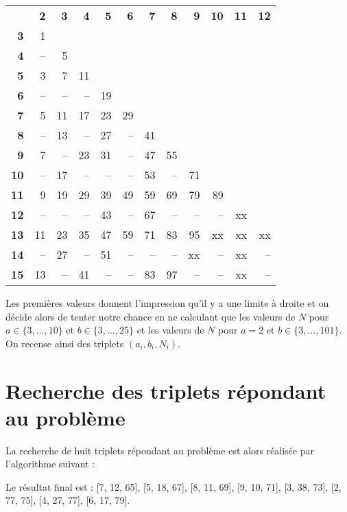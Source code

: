 \documentclass[11pt]{article}
\begin{document}
\noindent\begin{tabular}{r|r|r|r|r|r|r|r|r|r|r|r|}
&\bf 2&\bf 3&\bf 4&\bf 5&\bf 6&\bf 7&\bf 8&\bf 9&\bf 10&\bf 11&\bf 12 \\
\cline{2-2}
\bf 3 & 1 \\
\cline{2-3}
\bf 4 & -- & 5 \\
\cline{2-4}
\bf 5 & 3 & 7 & 11 \\
\cline{2-5}
\bf 6 & -- & -- & -- & 19 \\
\cline{2-6}
\bf 7 & 5 & 11 & 17 & 23 & 29 \\
\cline{2-7}
\bf 8 & -- & 13 & -- & 27 & -- & 41 \\
\cline{2-8}
\bf 9 & 7 & -- & 23 & 31 & -- & 47 & 55 \\
\cline{2-9}
\bf 10 & -- & 17 & -- & -- & -- & 53 & -- & 71 \\
\cline{2-10}
\bf 11 & 9 & 19 & 29 & 39 & 49 & 59 & 69 & 79 & 89 \\
\cline{2-11}
\bf 12 & -- & -- & -- & 43 & -- & 67 & -- & -- & -- & xx \\
\cline{2-12}
\bf 13 & 11 & 23 & 35 & 47 & 59 & 71 & 83 & 95 & xx & xx & xx \\
\cline{2-12}
\bf 14 & -- & 27 & -- & 51 & -- & -- & -- & xx & -- & xx & -- \\
\cline{2-12}
\bf 15 & 13 & -- & 41 & -- & -- & 83 & 97 & -- & -- & xx & -- \\
\hline
\end{tabular}
\vspace{5mm}

Les premières valeurs donnent l'impression qu'il y a une limite à droite et on décide alors de tenter notre chance en ne calculant que les valeurs de $N$ pour $a \in \{3, \ldots, 10\}$
et $b \in \{3, \ldots, 25\}$ et les valeurs de $N$ pour $a = 2$ et $b \in \{3, \ldots, 101\}$. On recense ainsi des triplets $(a_i, b_i, N_i)$.

\section{Recherche des triplets répondant au problème}

La recherche de huit triplets répondant au problème est alors réalisée par l'algorithme suivant :


 \vspace{5mm}
 Le résultat final est : [7, 12, 65], [5, 18, 67], [8, 11, 69], [9, 10, 71], [3, 38, 73], [2, 77, 75], [4, 27, 77], [6, 17, 79].
\end{document}
